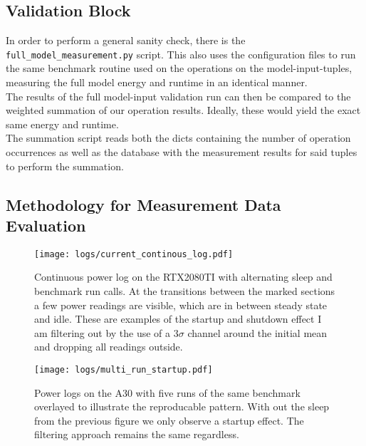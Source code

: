 \documentclass[conference]{IEEEtran}
\begin{document}
\subsection{Validation Block}
In order to perform a general sanity check, there is the \texttt{full\_model\_measurement.py} script. This also uses the configuration files to run the same benchmark routine used on the operations on the model-input-tuples, measuring the full model energy and runtime in an identical manner. \\
The results of the full model-input validation run can then be compared to the weighted summation of our operation results. Ideally, these would yield the exact same energy and runtime. \\
The summation script reads both the dicts containing the number of operation occurrences as well as the database with the measurement results for said tuples to perform the summation.

\subsection{Methodology for Measurement Data Evaluation}

\begin{figure}
    \texttt{[image: logs/current\_continous\_log.pdf]}
    \caption{Continuous power log on the RTX2080TI with alternating sleep and benchmark run calls. At the transitions between the marked sections a few power readings are visible, which are in between steady state and idle. These are examples of the startup and shutdown effect I am filtering out by the use of a $3 \sigma$ channel around the initial mean and dropping all readings outside.}
    \label{fig:startup1}
    \texttt{[image: logs/multi\_run\_startup.pdf]}
    \caption{Power logs on the A30 with five runs of the same benchmark overlayed to illustrate the reproducable pattern. With out the sleep from the previous figure we only observe a startup effect. The filtering approach remains the same regardless.}
    \label{fig:startup2}
\end{figure}
\end{document}
